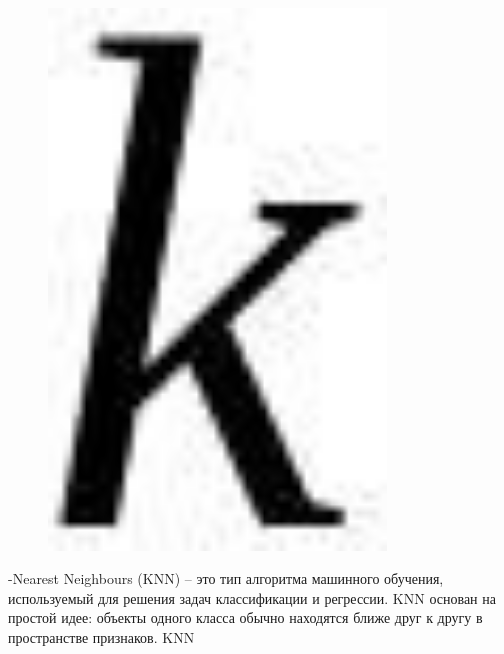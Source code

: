 \begin{figure}[H]
	\centering
	\includegraphics[width=0.8\textwidth]{assets/92}
	\caption*{}
\end{figure}-Nearest Neighbours (KNN) -- это тип
алгоритма машинного обучения, используемый для решения задач
классификации и регрессии. KNN основан на простой идее: объекты одного
класса обычно находятся ближе друг к другу в пространстве признаков. KNN
